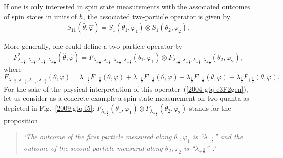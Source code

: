 \documentclass[fleqn,twoside]{article}      %
\begin{document}
If one is only interested in spin state measurements with the associated outcomes of spin states in units of $\hbar$,
the associated two-particle operator is given by
\begin{equation}
 S_{1 1 } ({\hat \theta},{\hat \varphi} ) =
S_{1 }( \theta_1,\varphi_1 )
\otimes
S_{1 }( \theta_2,\varphi_2 ).
\label{2004-gtq-e3F2nat}
\end{equation}

More generally, one could define a two-particle operator by
\begin{equation}
F^2_{\lambda_{-\frac{3}{2}},\lambda_{-\frac{1}{2}}, \lambda_{+\frac{1}{2}}, \lambda_{+\frac{3}{2}} } ({\hat \theta},{\hat \varphi} ) =
F_{\lambda_{-\frac{3}{2}},\lambda_{-\frac{1}{2}}, \lambda_{+\frac{1}{2}}, \lambda_{+\frac{3}{2}} } ( \theta_1,\varphi_1)
\otimes
F_{\lambda_{-\frac{3}{2}},\lambda_{-\frac{1}{2}}, \lambda_{+\frac{1}{2}}, \lambda_{+\frac{3}{2}} } ( \theta_2,\varphi_2 ),
\label{2004-gtq-e3F2gen}
\end{equation}
where
\begin{equation}
F_{\lambda_{-\frac{3}{2}},\lambda_{-\frac{1}{2}}, \lambda_{+\frac{1}{2}}, \lambda_{+\frac{3}{2}} } ( \theta ,\varphi )
=
 \lambda_{-\frac{3}{2}}F_{-\frac{3}{2}}(\theta ,\varphi) +  \lambda_{-\frac{1}{2}} F_{-\frac{1}{2}}(\theta ,\varphi) +
 \lambda_{\frac{1}{2}}F_{+\frac{1}{2}}(\theta ,\varphi)+  \lambda_{\frac{3}{2}}F_{+\frac{3}{2}}(\theta ,\varphi)
.
\label{2004-gtq-e3F2gen2}
\end{equation}
For the sake of the physical interpretation of this operator~(\ref{2004-gtq-e3F2gen}), let us consider as a concrete example
a spin state measurement on two quanta as depicted in Fig.~\ref{2009-gtq-f5}:
$ F_{\lambda_{-\frac{3}{2}}}(\theta_1 ,\varphi_1)\otimes   F_{\lambda_{+\frac{3}{2}}}(\theta_2 ,\varphi_2 )$  stands for the proposition
\begin{quote}
{\em `The outcome of the first particle measured along $\theta_1,\varphi_1$ is ``$\lambda_{-\frac{3}{2}}$''
      and
      the outcome of the second particle measured along $\theta_2,\varphi_2$ is ``$\lambda_{+\frac{3}{2}}$''~.'
}
\end{quote}
\end{document}

